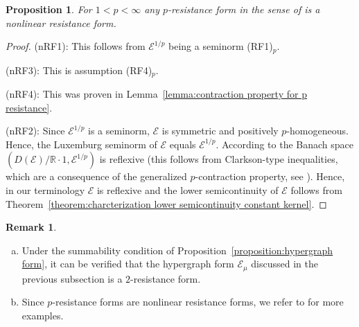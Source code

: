 \documentclass[a4paper,11pt,reqno]{amsart}
\newtheorem{proposition}[lemma]{Proposition}
\theoremstyle{definition}
\newtheorem{remark}[lemma]{Remark}
\numberwithin{equation}{section}
\newcommand{\cE}{{\mathcal E}}
\newcommand{\R}{{\mathbb R}}
\newcommand{\1}{\mathds{1}}
\begin{document}
\begin{proposition}\label{proposition:p resistance}
For $1 < p < \infty$ any $p$-resistance form in the sense of \cite{KS25} is a nonlinear resistance form.  
\end{proposition}
\begin{proof}
 (nRF1): This follows from $\cE^{1/p}$ being a seminorm (RF1)$_p$. 
 
 (nRF3): This is assumption (RF4)$_p$.
 
 (nRF4): This was proven in Lemma~\ref{lemma:contraction property for p resistance}.
 
 (nRF2): Since $\cE^{1/p}$ is a seminorm, $\cE$ is symmetric and positively $p$-homogeneous. Hence, the Luxemburg seminorm of $\cE$ equals $\cE^{1/p}$. According to \cite[Proposition~6.4]{KS25} the Banach space  $(D(\cE)/ \R \cdot 1, \cE^{1/p})$ is reflexive (this follows from Clarkson-type inequalities, which are a consequence of the generalized $p$-contraction property, see  \cite[Proposition 2.3]{KS25}). Hence, in our terminology $\cE$ is reflexive and the lower semicontinuity of $\cE$ follows from Theorem~\ref{theorem:charcterization lower semicontinuity constant kernel}.
\end{proof}

\begin{remark}
\begin{enumerate}[(a)]
 \item Under the summability condition of Proposition~\ref{proposition:hypergraph form}, it can be verified that the hypergraph form $\cE_\mu$ discussed in the previous subsection is a $2$-resistance form.
 \item Since $p$-resistance forms are nonlinear resistance forms, we refer to \cite{KS25} for more examples. 
\end{enumerate}

\end{remark}

 



 

\end{document}
